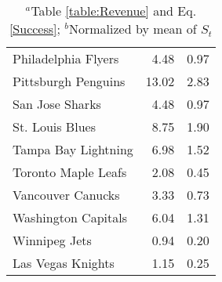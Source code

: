 \documentclass[11pt]{report}            %
\begin{document}
\begin{table}[htp]
\begin{tabular}{lrr}
Philadelphia Flyers & 4.48 & 0.97 \\ 
Pittsburgh Penguins & 13.02 & 2.83 \\ 
San Jose Sharks & 4.48 & 0.97 \\ 
St. Louis Blues & 8.75 & 1.90 \\ 
Tampa Bay Lightning & 6.98 & 1.52 \\ 
Toronto Maple Leafs & 2.08 & 0.45 \\ 
Vancouver Canucks & 3.33 & 0.73 \\ 
Washington Capitals & 6.04 & 1.31 \\ 
Winnipeg Jets & 0.94 & 0.20 \\ 
Las Vegas Knights & 1.15 & 0.25 \\ 
\hline
\end{tabular}
\caption{$^a$Table \ref{table:Revenue} and Eq. \ref{Success}; $^b$Normalized by mean of $S_t$}
\label{table:St}
\end{table}
\end{document}
